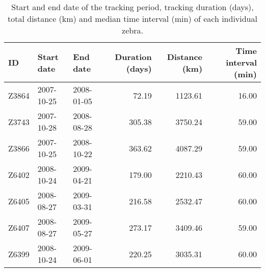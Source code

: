 \begin{table}[H]
\centering
\caption[Tracking summary of each individual, Ngamiland]{Start and end date of the tracking period, 
tracking duration (days), total distance (km) and 
median time interval (min) of each individual zebra.} 
\label{table:summary_zebra_move_BWA}
\begin{tabular}{lllrrr}
  \toprule
ID & Start date & End date & Duration (days) & Distance (km) & Time interval (min) \\ 
  \midrule
Z3864 & 2007-10-25 & 2008-01-05 & 72.19 & 1123.61 & 16.00 \\ 
  Z3743 & 2007-10-28 & 2008-08-28 & 305.38 & 3750.24 & 59.00 \\ 
  Z3866 & 2007-10-25 & 2008-10-22 & 363.62 & 4087.29 & 59.00 \\ 
  Z6402 & 2008-10-24 & 2009-04-21 & 179.00 & 2210.43 & 60.00 \\ 
  Z6405 & 2008-08-27 & 2009-03-31 & 216.58 & 2532.47 & 60.00 \\ 
  Z6407 & 2008-08-27 & 2009-05-27 & 273.17 & 3409.46 & 59.00 \\ 
  Z6399 & 2008-10-24 & 2009-06-01 & 220.25 & 3035.31 & 60.00 \\ 
   \bottomrule
\end{tabular}
\end{table}
